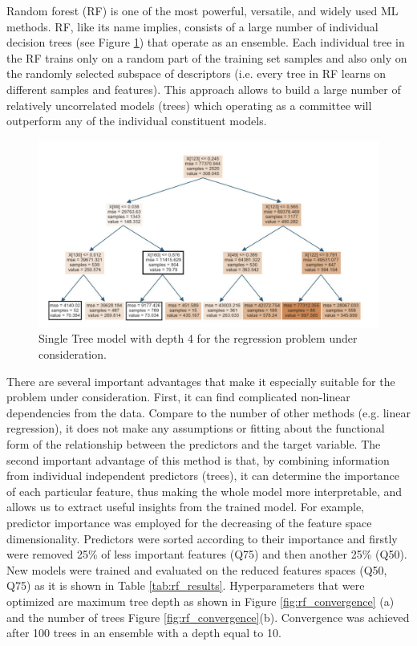 Random forest (RF) is one of the most powerful, versatile, and widely used ML methods. RF, like its name implies, consists of a large number of individual decision trees (see Figure \ref{fig:rf_scetch}) that operate as an ensemble. Each individual tree in the RF trains only on a random part of the training set samples and also only on the randomly selected subspace of descriptors (i.e. every tree in RF learns on different samples and features). This approach allows to build a large number of relatively uncorrelated models (trees) which operating as a committee will outperform any of the individual constituent models.

\begin{figure}[H]
	\centering
	\includegraphics[width=160mm]{fig/ml_fig/rf_scetch.png}
	\caption[Single Tree model with depth 4 for the regression problem under consideration.]{Single Tree model with depth 4 for the regression problem under consideration.}
\label{fig:rf_scetch}
\end{figure}

There are several important advantages that make it especially suitable for the problem under consideration. First, it can find complicated non-linear dependencies from the data. Compare to the number of other methods (e.g. linear regression), it does not make any assumptions or fitting about the functional form of the relationship between the predictors and the target variable. The second important advantage of this method is that, by combining information from individual independent predictors (trees), it can determine the importance of each particular feature, thus making the whole model more interpretable, and allows us to extract useful insights from the trained model.
For example, predictor importance was employed for the decreasing of the feature space dimensionality. Predictors were sorted according to their importance and firstly were removed 25\% of less important features (Q75) and then another 25\% (Q50). New models were trained and evaluated on the reduced features spaces (Q50, Q75) as it is shown in Table \ref{tab:rf_results}.
Hyperparameters that were optimized are maximum tree depth as shown in Figure \ref{fig:rf_convergence} (a) and the number of trees Figure \ref{fig:rf_convergence}(b). Convergence was achieved after 100 trees in an ensemble with a depth equal to 10.

